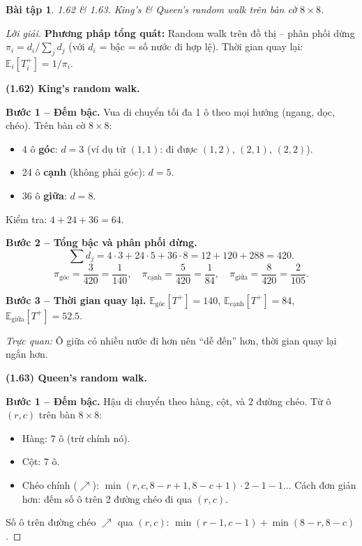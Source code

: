 \documentclass[8pt,a4paper]{article}
\newtheorem{exercise}{Bài tập}
\newenvironment{solution}{\begin{proof}[Lời giải]}{\end{proof}}
\newcommand{\E}{\mathbb{E}}
\begin{document}
\begin{exercise}
1.62 \& 1.63. King's \& Queen's random walk trên bàn cờ $8 \times 8$.
\end{exercise}
\begin{solution}
\textbf{Phương pháp tổng quát:} Random walk trên đồ thị -- phân phối dừng $\pi_i = d_i / \sum_j d_j$ (với $d_i$ = bậc = số nước đi hợp lệ). Thời gian quay lại: $\E_i[T_i^+] = 1/\pi_i$.

\textbf{(1.62) King's random walk.}

\textbf{Bước 1 -- Đếm bậc.}
Vua di chuyển tối đa 1 ô theo mọi hướng (ngang, dọc, chéo). Trên bàn cờ $8 \times 8$:
\begin{itemize}[nosep]
  \item 4 ô \textbf{góc}: $d = 3$ (ví dụ từ $(1,1)$: đi được $(1,2)$, $(2,1)$, $(2,2)$).
  \item 24 ô \textbf{cạnh} (không phải góc): $d = 5$.
  \item 36 ô \textbf{giữa}: $d = 8$.
\end{itemize}
Kiểm tra: $4 + 24 + 36 = 64$. \checkmark

\textbf{Bước 2 -- Tổng bậc và phân phối dừng.}
\[
  \sum d_j = 4 \cdot 3 + 24 \cdot 5 + 36 \cdot 8 = 12 + 120 + 288 = 420.
\]
\[
  \pi_{\text{góc}} = \frac{3}{420} = \frac{1}{140}, \quad \pi_{\text{cạnh}} = \frac{5}{420} = \frac{1}{84}, \quad \pi_{\text{giữa}} = \frac{8}{420} = \frac{2}{105}.
\]

\textbf{Bước 3 -- Thời gian quay lại.}
$\E_{\text{góc}}[T^+] = 140$, $\E_{\text{cạnh}}[T^+] = 84$, $\E_{\text{giữa}}[T^+] = 52.5$.

\textit{Trực quan:} Ô giữa có nhiều nước đi hơn nên ``dễ đến'' hơn, thời gian quay lại ngắn hơn.

\medskip
\textbf{(1.63) Queen's random walk.}

\textbf{Bước 1 -- Đếm bậc.}
Hậu di chuyển theo hàng, cột, và 2 đường chéo. Từ ô $(r, c)$ trên bàn $8 \times 8$:
\begin{itemize}[nosep]
  \item Hàng: $7$ ô (trừ chính nó).
  \item Cột: $7$ ô.
  \item Chéo chính ($\nearrow$): $\min(r, c, 8-r+1, 8-c+1) \cdot 2 - 1 - 1$... Cách đơn giản hơn: đếm số ô trên 2 đường chéo đi qua $(r,c)$.
\end{itemize}

Số ô trên đường chéo $\nearrow$ qua $(r,c)$: $\min(r-1, c-1) + \min(8-r, 8-c)$.


\end{solution}
\end{document}
